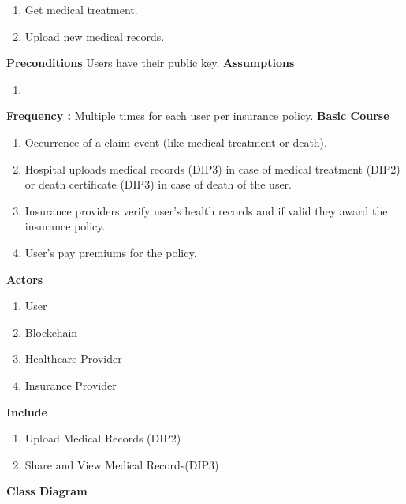 \begin{enumerate}
	      \begin{enumerate}
	      	\item  Get medical treatment.
	      	\item  Upload new medical records.
	      \end{enumerate}
	      \textbf{Preconditions} Users have their public key.
	      \newline
	      \textbf{Assumptions}
	      \begin{enumerate}
	      	\item 
	      \end{enumerate}
	      \textbf{Frequency :}  Multiple times for each user per insurance policy.\newline
	      \textbf{Basic Course}
	      \begin{enumerate}
	      	\item	Occurrence of a claim event (like medical treatment or death).
	      	\item	Hospital uploads medical records (DIP3) in case of medical treatment (DIP2) or death certificate (DIP3) in case of death of the user.
	      	\item  	Insurance providers verify user’s health records and if valid they award the insurance policy.
	      	\item 	User’s pay premiums for the policy.
	      \end{enumerate}
	      \textbf{Actors}
	      \begin{enumerate}
	      	\item User
	      	\item Blockchain
	      	\item Healthcare Provider
	      	\item Insurance Provider
	      \end{enumerate} 
	      \textbf{Include}
	      \begin{enumerate}
	      	\item Upload Medical Records (DIP2)
	      	\item Share and View Medical Records(DIP3)
	      \end{enumerate}     
\end{enumerate}
\clearpage
\textbf{Class Diagram}
